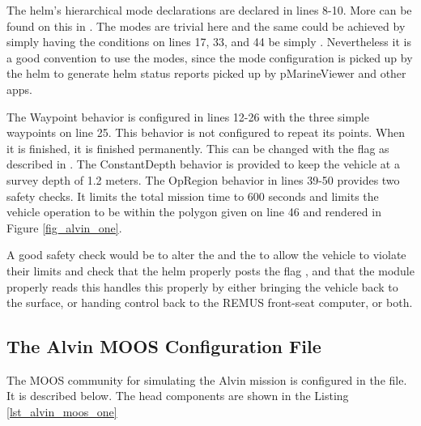 The helm's hierarchical mode declarations are declared in lines 8-10.
More can be found on this in \cite{bnsl10a}. The modes are trivial
here and the same could be achieved by simply having the conditions on
lines 17, 33, and 44 be simply . Nevertheless
it is a good convention to use the modes, since the mode configuration
is picked up by the helm to generate helm status reports picked up by 
pMarineViewer and other apps.

\pskip

The Waypoint behavior is configured in lines 12-26 with the three
simple waypoints on line 25. This behavior is not configured to repeat
its points.  When it is finished, it is finished permanently. This can
be changed with the  flag as described in
\cite{bnsl10a}.  The ConstantDepth behavior is provided to keep the
vehicle at a survey depth of 1.2 meters. The OpRegion behavior in
lines 39-50 provides two safety checks. It limits the total mission
time to 600 seconds and limits the vehicle operation to be within the
polygon given on line 46 and rendered in Figure \ref{fig_alvin_one}.

\pskip

A good safety check would be to alter the  and the 
 to allow the vehicle to violate their limits and check 
that the helm properly posts the flag , 
and that the  module properly reads this handles this 
properly by either bringing the vehicle back to the surface, or handing
control back to the REMUS front-seat computer, or both.


\subsection{The Alvin MOOS Configuration File}

The MOOS community for simulating the Alvin mission is configured in
the  file. It is described below. The head components
are shown in the Listing \ref{lst_alvin_moos_one}


